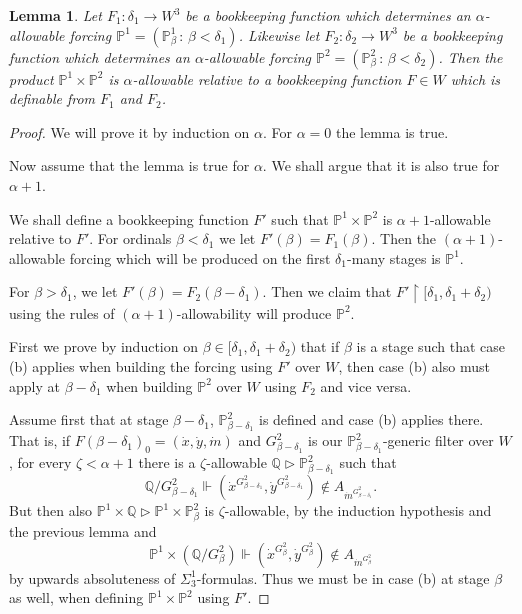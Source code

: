 \documentclass[a4paper,11pt]{article}
\newtheorem{lemma}[theorem]{Lemma}
\newcommand{\forceP}{\mathbb{P}}
\newcommand{\forceQ}{\mathbb{Q}}
\begin{document}
\begin{lemma}\label{alphaallowableclosedunderproducts}
Let $F_1 : \delta_1 \rightarrow W^3$ be a bookkeeping function which determines an $\alpha$-allowable forcing $\forceP^1=(\forceP^1_{\beta} \, : \,  \beta < \delta_1)$. Likewise let $F_2 : \delta_2 \rightarrow W^3$ be a bookkeeping function which determines an $\alpha$-allowable forcing $\forceP^2=(\forceP^2_{\beta} \, : \,  \beta < \delta_2)$.
Then the product $\forceP^1 \times \forceP^2$ is $\alpha$-allowable relative to a bookkeeping function $F \in W$ which is definable from $F_1$ and $F_2$.
\end{lemma}
\begin{proof}
We will prove it by induction on $\alpha$. For $\alpha=0$ the lemma is true.

Now assume that the lemma is true for $\alpha$. We shall argue that it is also true for $\alpha+1$.

We shall define a bookkeeping function $F'$ such that $\forceP^1 \times \forceP^2$ is $\alpha+1$-allowable relative to $F'$.
For ordinals $\beta < \delta_1$ we let $F'(\beta)=F_1(\beta)$. Then the $(\alpha+1)$-allowable forcing which will be produced on the first $\delta_1$-many stages is $\forceP^1$.

For $\beta> \delta_1$, we let $F'(\beta)= F_2( \beta -\delta_1)$. Then we claim that $F' \upharpoonright [\delta_1,\delta_1+\delta_2)$ using the rules of $(\alpha+1)$-allowability will produce $\forceP^2$.

First we prove by induction on $\beta \in [\delta_1, \delta_1 +\delta_2)$ that if $\beta$ is a stage such that case (b) applies when building the forcing using $F'$ over $W$, then case (b) also must apply at $\beta - \delta_1$ when building $\forceP^2$ over $W$ using $F_2$ and vice versa.

Assume first that at stage ${\beta-\delta_1}$, $\forceP^2_{\beta-\delta_1}$ is defined and case (b) applies there. That is,
if $F( {\beta-\delta_1})_0= (\dot{x}, \dot{y}, \dot{m})$ and  $G^2_{\beta-\delta_1}$ is our $\forceP^2_{\beta-\delta_1}$-generic filter over $W$, for every $\zeta < \alpha+1$ there is a $\zeta$-allowable $\forceQ  \triangleright \forceP^2_{\beta-\delta_1}$ such that \[ \forceQ \slash G^2_{\beta-\delta_1} \Vdash (\dot{x}^{ G^2_{\beta-\delta_1}},\dot{y}^{ G^2_{\beta-\delta_1}} ) \notin A_{\dot{m}^{G^2_{\beta-\delta_1}}}. \]
But then also $\forceP^1 \times \forceQ \triangleright \forceP^1 \times \forceP^2_{\beta}$ is $\zeta$-allowable, by the induction hypothesis and the previous lemma and 
\[ \forceP^1 \times (\forceQ \slash G^2_{\beta}) \Vdash (\dot{x}^{G^2_{\beta}} ,\dot{y}^{G^2_{\beta}}) \notin A_{\dot{m}^{G^2_{\beta}}} \] by upwards absoluteness of $\Sigma^1_3$-formulas. Thus we must be in  case (b) at stage $\beta$ as well, when defining $\forceP^1 \times \forceP^2$ using $F'$.


\end{proof}
\end{document}
